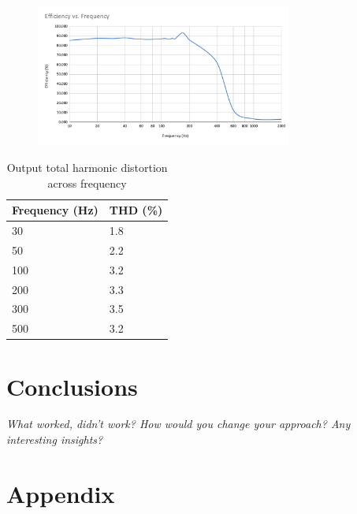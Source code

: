 \documentclass[11pt]{article}
\begin{document}
{\begin{figure}[h!]
  \centering
  \includegraphics[width=0.75\textwidth]{img/testing/Efficiency_vs._Frequency.pdf}
  \caption{}
\end{figure}

\begin{table}[h!]
  \centering
  \begin{tabular}{l|l}
  \rowcolor[HTML]{E0E0E0} 
  \textbf{Frequency (Hz)} & \textbf{THD (\%)} \\ \hline
  30                 & 1.8               \\
  50                 & 2.2               \\
  100                & 3.2               \\
  200                & 3.3               \\
  300                & 3.5               \\
  500                & 3.2              
  \end{tabular}
  \caption{Output total harmonic distortion across frequency}
  \label{T:THD}
\end{table}


\section{Conclusions}
 
\textit{What worked, didn’t work? How would you change your approach? Any interesting insights?}

\newpage
\section*{Appendix}

}
\end{document}

